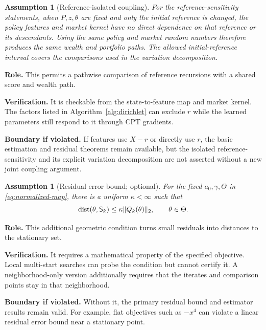 \documentclass[11pt]{article}
\newtheorem{assumption}[theorem]{Assumption}
\newcommand{\1}{\mathbf 1}
\newcommand{\dist}{\operatorname{dist}}
\DeclarePairedDelimiter{\norm}{\lVert}{\rVert}
\newcommand{\Sta}{\mathsf S}
\theoremstyle{definition}
\newcommand{\assess}[3]{\par\noindent\textbf{Role.} #1\par\noindent\textbf{Verification.} #2\par\noindent\textbf{Boundary if violated.} #3\par\medskip}
\begin{document}
\begin{assumption}[Reference-isolated coupling]\label{ass:reference-coupling}
For the reference-sensitivity statements, when $P,z,\theta$ are fixed and only the initial reference is changed, the policy features and market kernel have no direct dependence on that reference or its descendants. Using the same policy and market random numbers therefore produces the same wealth and portfolio paths. The allowed initial-reference interval covers the comparisons used in the variation decomposition.
\end{assumption}
\assess{This permits a pathwise comparison of reference recursions with a shared score and wealth path.}{It is checkable from the state-to-feature map and market kernel. The factors listed in Algorithm~\ref{alg:dirichlet} can exclude $r$ while the learned parameters still respond to it through CPT gradients.}{If features use $X-r$ or directly use $r$, the basic estimation and residual theorems remain available, but the isolated reference-sensitivity and its explicit variation decomposition are not asserted without a new joint coupling argument.}

\begin{assumption}[Residual error bound; optional]\label{ass:error-bound}
For the fixed $a_0,\gamma,\Theta$ in \eqref{eq:normalized-map}, there is a uniform $\kappa<\infty$ such that
\begin{equation}\label{eq:error-bound}
 \dist(\theta,\Sta_k)\le\kappa\norm{Q_k(\theta)}_2,
 \qquad \theta\in\Theta.
\end{equation}
\end{assumption}
\assess{This additional geometric condition turns small residuals into distances to the stationary set.}{It requires a mathematical property of the specified objective. Local multi-start searches can probe the condition but cannot certify it. A neighborhood-only version additionally requires that the iterates and comparison points stay in that neighborhood.}{Without it, the primary residual bound and estimator results remain valid. For example, flat objectives such as $-x^4$ can violate a linear residual error bound near a stationary point.}
\end{document}
